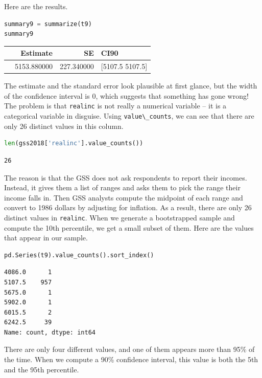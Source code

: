 Here are the results.

\begin{lstlisting}[language=Python,style=source]
summary9 = summarize(t9)
summary9
\end{lstlisting}

\begin{tabular}{lrrl}
\midrule
 & Estimate & SE & CI90 \\
\midrule
 & 5153.880000 & 227.340000 & [5107.5 5107.5] \\
\midrule
\end{tabular}

The estimate and the standard error look plausible at first glance, but
the width of the confidence interval is 0, which suggests that something
has gone wrong! The problem is that \passthrough{\lstinline!realinc!} is
not really a numerical variable -- it is a categorical variable in
disguise. Using \passthrough{\lstinline!value\_counts!}, we can see that
there are only 26 distinct values in this column.

\begin{lstlisting}[language=Python,style=source]
len(gss2018['realinc'].value_counts())
\end{lstlisting}

\begin{lstlisting}[style=output]
26
\end{lstlisting}

The reason is that the GSS does not ask respondents to report their
incomes. Instead, it gives them a list of ranges and asks them to pick
the range their income falls in. Then GSS analysts compute the midpoint
of each range and convert to 1986 dollars by adjusting for inflation. As
a result, there are only 26 distinct values in
\passthrough{\lstinline!realinc!}. When we generate a bootstrapped
sample and compute the 10th percentile, we get a small subset of them.
Here are the values that appear in our sample.

\begin{lstlisting}[language=Python,style=source]
pd.Series(t9).value_counts().sort_index()
\end{lstlisting}

\begin{lstlisting}[style=output]
4086.0      1
5107.5    957
5675.0      1
5902.0      1
6015.5      2
6242.5     39
Name: count, dtype: int64
\end{lstlisting}

There are only four different values, and one of them appears more than
95\% of the time. When we compute a 90\% confidence interval, this value
is both the 5th and the 95th percentile.


